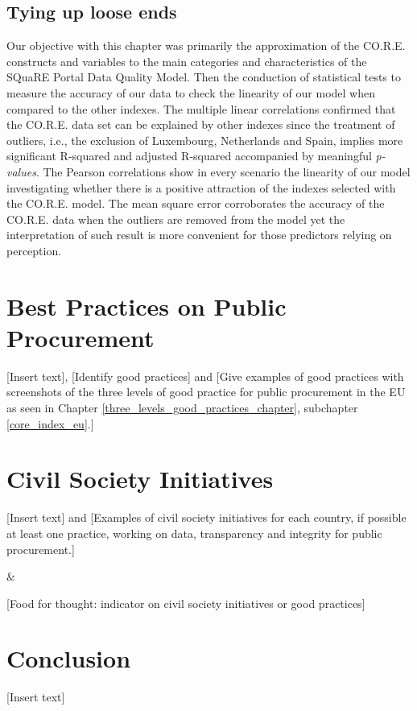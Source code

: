 \documentclass[a4paper, twoside]{report}
\begin{document}
\section{Tying up loose ends}

Our objective with this chapter was primarily the approximation of the CO.R.E. constructs and variables to the main categories and characteristics of the SQuaRE Portal Data Quality Model. Then the conduction of statistical tests to measure the accuracy of our data to check the linearity of our model when compared to the other indexes. The multiple linear correlations confirmed that the CO.R.E. data set can be explained by other indexes since the treatment of outliers, i.e., the exclusion of Luxembourg, Netherlands and Spain, implies more significant R-squared and adjusted R-squared accompanied by meaningful \textit{p-values}. The Pearson correlations show in every scenario the linearity of our model investigating whether there is a positive attraction of the indexes selected with the CO.R.E. model. The mean square error corroborates the accuracy of the CO.R.E. data when the outliers are removed from the model yet the interpretation of such result is more convenient for those predictors relying on perception.    


\clearpage

\chapter{Best Practices on Public Procurement}

[Insert text], [Identify good practices] and [Give examples of good practices with screenshots of the three levels of good practice for public procurement in the EU as seen in Chapter \ref{three_levels_good_practices_chapter}, subchapter \ref{core_index_eu}.]

\clearpage

\chapter{Civil Society Initiatives}

[Insert text] and [Examples of civil society initiatives for each country, if possible at least one practice, working on data, transparency and integrity for public procurement.]

\&

[Food for thought: indicator on civil society initiatives or good practices]

\clearpage
\chapter{Conclusion}

[Insert text]

\clearpage




\cleardoublepage



\end{document}

